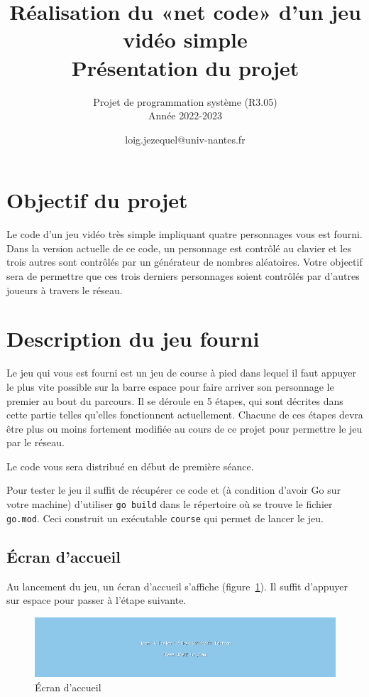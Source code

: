 \documentclass[a4paper]{article}
\title{Réalisation du «net code» d'un jeu vidéo simple\\ Présentation du projet}
\author{Projet de programmation système (R3.05)\\ Année 2022-2023}
\date{loig.jezequel@univ-nantes.fr}
\begin{document}
\maketitle{}

\section{Objectif du projet}

Le code d'un jeu vidéo très simple impliquant quatre personnages vous est fourni.
Dans la version actuelle de ce code, un personnage est contrôlé au clavier et les trois autres sont contrôlés par un générateur de nombres aléatoires.
Votre objectif sera de permettre que ces trois derniers personnages soient contrôlés par d'autres joueurs à travers le réseau.

\section{Description du jeu fourni}

Le jeu qui vous est fourni est un jeu de course à pied dans lequel il faut appuyer le plus vite possible sur la barre espace pour faire arriver son personnage le premier au bout du parcours.
Il se déroule en 5 étapes, qui sont décrites dans cette partie telles qu'elles fonctionnent actuellement.
Chacune de ces étapes devra être plus ou moins fortement modifiée au cours de ce projet pour permettre le jeu par le réseau.

Le code vous sera distribué en début de première séance.

Pour tester le jeu il suffit de récupérer ce code et (à condition d'avoir Go sur votre machine) d'utiliser \verb|go build| dans le répertoire où se trouve le fichier \verb|go.mod|.
Ceci construit un exécutable \verb|course| qui permet de lancer le jeu.

\subsection{Écran d'accueil}

Au lancement du jeu, un écran d'accueil s'affiche (figure~\ref{fig:titre}). Il suffit d'appuyer sur espace pour passer à l'étape suivante.

\begin{figure}[htbp]
  \centering
  \includegraphics[width=400pt]{titre.png}
  \caption{Écran d'accueil}\label{fig:titre}
\end{figure}
\end{document}
